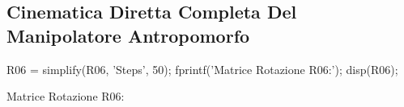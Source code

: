 \documentclass[11pt, a4paper]{article}
\renewcommand{\arraystretch}{1.3}
\begin{document}
\thispagestyle{empty}
\begin{lrbox}{\rotpagebox}
\begin{minipage}[t][\textwidth][t]{\textheight}
\vspace{0pt}
\subsection*{Cinematica Diretta Completa Del Manipolatore Antropomorfo}

\begin{matlabcode}
R06 = simplify(R06, 'Steps', 50);
fprintf('Matrice Rotazione R06:\n');
disp(R06);
\end{matlabcode}
\begin{matlaboutput}
Matrice Rotazione R06:
\end{matlaboutput}

\vspace{10pt}
\begin{matlabsymbolicoutput}
\renewcommand{\arraystretch}{1.85}
\setlength{\arraycolsep}{8pt}
\end{matlabsymbolicoutput}

\vspace{12pt}


\end{minipage}
\end{lrbox}
\end{document}
